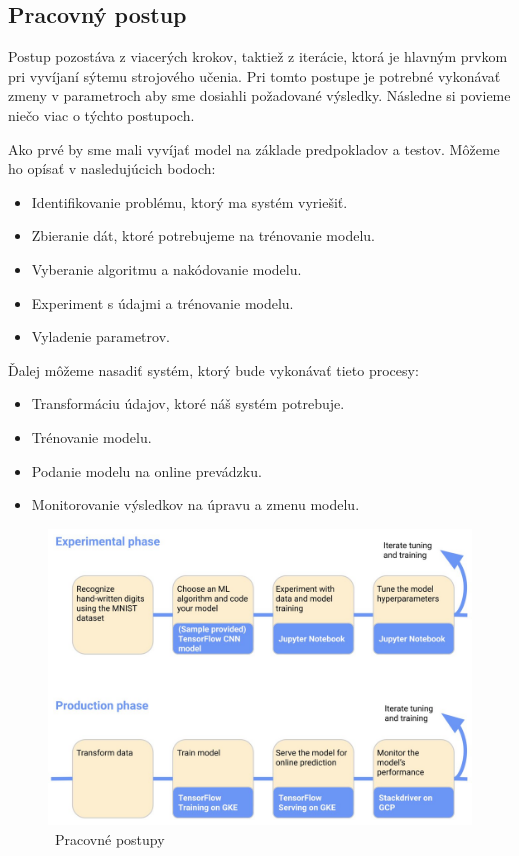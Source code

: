 \subsection{Pracovný postup}

Postup pozostáva z viacerých krokov, taktiež z iterácie, ktorá je hlavným prvkom pri vyvíjaní sýtemu strojového učenia. Pri tomto postupe je potrebné vykonávať zmeny v parametroch aby sme dosiahli požadované výsledky. Následne si povieme niečo viac o týchto postupoch.

Ako prvé by sme mali vyvíjať model na základe predpokladov a testov. Môžeme ho opísať v nasledujúcich bodoch: \cite{work}

\begin{itemize}
    \item Identifikovanie problému, ktorý ma systém vyriešiť.
    \item Zbieranie dát, ktoré potrebujeme na trénovanie modelu.
    \item Vyberanie algoritmu a nakódovanie modelu.
    \item Experiment s údajmi a trénovanie modelu.
	\item Vyladenie parametrov.
\end{itemize}

Ďalej môžeme nasadiť systém, ktorý bude vykonávať tieto procesy:

\begin{itemize}
    \item Transformáciu údajov, ktoré náš systém potrebuje.
	\item Trénovanie modelu.
	\item Podanie modelu na online prevádzku.
	\item Monitorovanie výsledkov na úpravu a zmenu modelu.
\end{itemize}

\begin{figure}[!ht]
    \includegraphics[width=.9\textwidth]{figures/kubeflowwork}
    \caption{\ Pracovné postupy \cite{work} \label{o:latex_friendly_zone}}
\end{figure}

